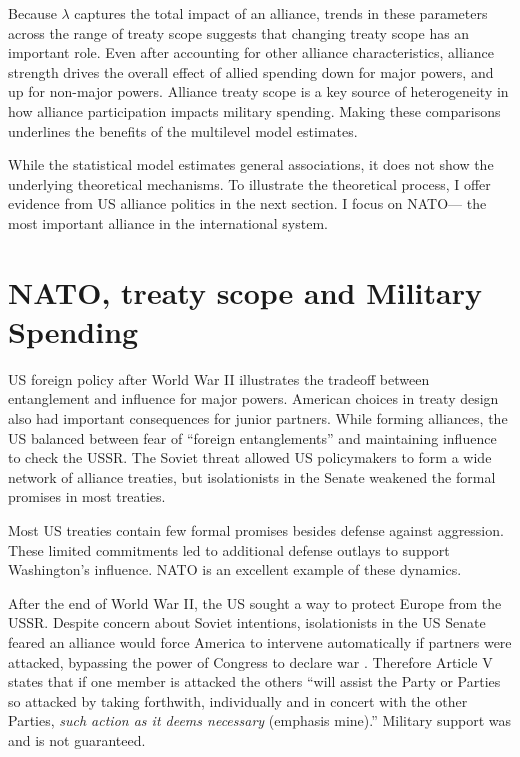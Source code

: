 \documentclass[12pt]{article}
\begin{document}
Because $\lambda$ captures the total impact of an alliance, trends in these parameters across the range of treaty scope suggests that changing treaty scope has an important role. 
Even after accounting for other alliance characteristics, alliance strength drives the overall effect of allied spending down for major powers, and up for non-major powers. 
Alliance treaty scope is a key source of heterogeneity in how alliance participation impacts military spending. 
Making these comparisons underlines the benefits of the multilevel model estimates. 


While the statistical model estimates general associations, it does not show the underlying theoretical mechanisms. 
To illustrate the theoretical process, I offer evidence from US alliance politics in the next section.  
I focus on NATO--- the most important alliance in the international system. 


\section{NATO, treaty scope and Military Spending}


US foreign policy after World War II illustrates the tradeoff between entanglement and influence for major powers.
American choices in treaty design also had important consequences for junior partners. 
While forming alliances, the US balanced between fear of ``foreign entanglements'' and maintaining influence to check the USSR.
The Soviet threat allowed US policymakers to form a wide network of alliance treaties, but isolationists in the Senate weakened the formal promises in most treaties. 


Most US treaties contain few formal promises besides defense against aggression. 
These limited commitments led to additional defense outlays to support Washington's influence.  
NATO is an excellent example of these dynamics. 


After the end of World War II, the US sought a way to protect Europe from the USSR. 
Despite concern about Soviet intentions, isolationists in the US Senate feared an alliance would force America to intervene automatically if partners were attacked, bypassing the power of Congress to declare war \citep[pg. 280-1]{Acheson1969}.
Therefore Article V states that if one member is attacked the others ``will assist the Party or Parties so attacked by taking forthwith, individually and in concert with the other Parties, \emph{such action as it deems necessary} (emphasis mine).'' 
Military support was and is not guaranteed. 
\end{document}
